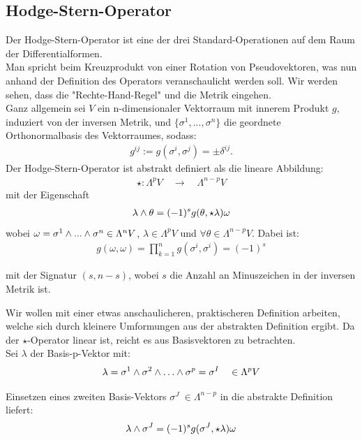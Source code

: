 \subsection{Hodge-Stern-Operator}
Der Hodge-Stern-Operator ist eine der drei Standard-Operationen auf dem Raum der Differentialformen. \\
Man spricht beim Kreuzprodukt von einer Rotation von Pseudovektoren, was nun anhand der Definition des Operators veranschaulicht werden soll. Wir werden sehen, dass die "Rechte-Hand-Regel" und die Metrik eingehen. \\
Ganz allgemein sei $V$ ein n-dimensionaler Vektorraum mit innerem Produkt $g$, induziert von der inversen Metrik, und $\{\sigma^1, ..., \sigma^n\}$ die geordnete Orthonormalbasis des Vektorraumes, sodass:
\begin{align*}
g^{i j} := g(\sigma^{i},\sigma^{j}) = \pm \delta^{i j}.
\end{align*}
Der Hodge-Stern-Operator ist abstrakt definiert als die lineare Abbildung:
\begin{align*}
\star : \Lambda^p V \quad \rightarrow \quad  \Lambda^{n-p} V 
\end{align*}
mit der Eigenschaft
\begin{align}
\lambda \wedge \theta = (-1)^s g(\theta,\star\lambda) \omega
\end{align}
wobei $\omega = \sigma^1 \wedge ... \wedge \sigma^n \in \Lambda^n V$, $\lambda \in \Lambda^p V$ und $\forall \theta \in \Lambda^{n-p} V$. Dabei ist:
\begin{align}
g(\omega,\omega) = \prod_{k=1}^{n} g(\sigma^{i},\sigma^{i}) = (-1)^s
\end{align}
 
mit der Signatur $(s,n-s)$, wobei $s$ die Anzahl an Minuszeichen in der inversen Metrik ist.

 
Wir wollen mit einer etwas anschaulicheren, praktischeren Definition arbeiten, welche sich durch kleinere Umformungen aus der abstrakten Definition ergibt. Da der $\star$-Operator linear ist, reicht es aus Basisvektoren zu betrachten. \\

 Sei $\lambda$ der Basis-p-Vektor mit:
 \begin{align}
 \lambda = \sigma^1 \w \sigma^2 \w \dots \w \sigma^p = \sigma^{I} \quad \in \Lambda^p V
 \end{align}
 
Einsetzen eines zweiten Basis-Vektors $\sigma^J \ \in \Lambda^{n-p}$ in die abstrakte Definition liefert:
\begin{align}
\lambda \wedge \sigma^J = (-1)^s g(\sigma^J,\star \lambda)\omega
\end{align}

